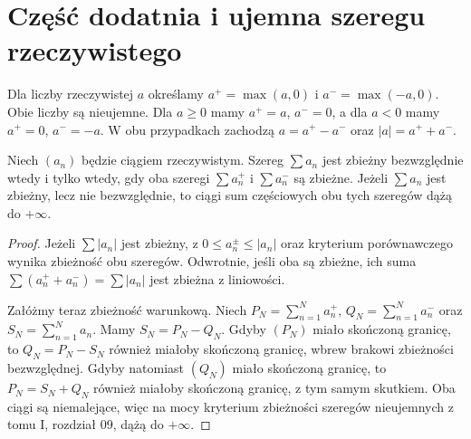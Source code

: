 \section{Część dodatnia i ujemna szeregu rzeczywistego}
\begin{definicja}
\label{ma2:def:positive-negative-parts}
Dla liczby rzeczywistej $a$ określamy $a^+=\max(a,0)$ i $a^-=\max(-a,0)$. Obie liczby są nieujemne. Dla $a\ge0$ mamy $a^+=a$, $a^-=0$, a dla $a<0$ mamy $a^+=0$, $a^-=-a$. W obu przypadkach zachodzą $a=a^+-a^-$ oraz $|a|=a^++a^-$.
\end{definicja}
\begin{twierdzenie}
\label{ma1:thm:positive-negative-parts}
Niech $(a_n)$ będzie ciągiem rzeczywistym. Szereg $\sum a_n$ jest zbieżny bezwzględnie wtedy i tylko wtedy, gdy oba szeregi $\sum a_n^+$ i $\sum a_n^-$ są zbieżne. Jeżeli $\sum a_n$ jest zbieżny, lecz nie bezwzględnie, to ciągi sum częściowych obu tych szeregów dążą do $+\infty$.
\end{twierdzenie}
\begin{proof}
Jeżeli $\sum|a_n|$ jest zbieżny, z $0\le a_n^\pm\le |a_n|$ oraz kryterium porównawczego wynika zbieżność obu szeregów. Odwrotnie, jeśli oba są zbieżne, ich suma $\sum(a_n^++a_n^-)=\sum|a_n|$ jest zbieżna z liniowości.

Załóżmy teraz zbieżność warunkową. Niech $P_N=\sum_{n=1}^N a_n^+$, $Q_N=\sum_{n=1}^N a_n^-$ oraz $S_N=\sum_{n=1}^N a_n$. Mamy $S_N=P_N-Q_N$. Gdyby $(P_N)$ miało skończoną granicę, to $Q_N=P_N-S_N$ również miałoby skończoną granicę, wbrew brakowi zbieżności bezwzględnej. Gdyby natomiast $(Q_N)$ miało skończoną granicę, to $P_N=S_N+Q_N$ również miałoby skończoną granicę, z tym samym skutkiem. Oba ciągi są niemalejące, więc na mocy kryterium zbieżności szeregów nieujemnych z tomu I, rozdział 09, dążą do $+\infty$.
\end{proof}

